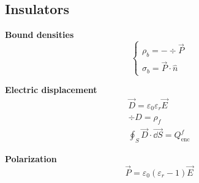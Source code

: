 \documentclass[10pt]{extarticle}
\numberwithin{equation}{section}
\begin{document}
\begin{multicols}{2}
    \subsection{Insulators}

    \textbf{Bound densities}
    \begin{equation}
        \begin{cases}
            \rho_b = -\div \vec P \\
            \sigma_b = \vec P \cdot \hat n
        \end{cases}
    \end{equation}

    \textbf{Electric displacement}
    \begin{gather}
        \vec D = \varepsilon_0 \varepsilon_r \vec E \\
        \div D = \rho_f \\
        \oint_S \vec D \cdot \vec{\dd S} = Q_\text{enc}^f
    \end{gather}

    \textbf{Polarization}
    \begin{equation}
        \vec P = \varepsilon_0 (\varepsilon_r-1) \vec E
    \end{equation}

\end{multicols}
\end{document}
